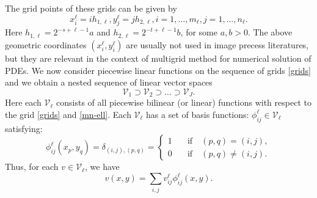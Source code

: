 The grid points of these grids can be given by
$$
x_i^{\ell}=i h_{1,\ell}, y_j^{\ell}=j h_{2,\ell},  i=1, \ldots, m_\ell,
j=1, \ldots, n_\ell.
$$
Here $h_{1,\ell} = 2^{-s + \ell -1}a$ and $h_{2,\ell} = 2^{-t + \ell - 1}b$,
for some $a,b >0$. The above geometric coordinates $(x_i^\ell, y_i^\ell)$
are usually not used in image precess literatures, but they are relevant
in the context of multigrid method for numerical solution of PDEs.
We now consider piecewise linear functions on the sequence of grids
\eqref{grids} and we obtain a nested sequence of linear vector spaces
\begin{equation}
\label{Vk}
\mathcal V_1\supset\mathcal V_2\supset\ldots\supset \mathcal
V_J.
\end{equation}
Here each $\mathcal V_\ell$ consists of all piecewise bilinear (or linear)
functions with respect to the grid \eqref{grids} and \eqref{mn-ell}.
Each $\mathcal V_\ell $ has a set of basis functions:
$\phi_{ij}^\ell\in \mathcal V_\ell$ satisfying:
$$
\phi_{ij}^\ell(x_p,y_q)=\delta_{(i,j), (p,q)} = 
\begin{cases}
1 \quad &\text{if} \quad (p,q) = (i,j), \\
0 \quad &{\text{if}} \quad (p,q)\neq (i,j).
\end{cases}
$$
Thus, for each $v \in \mathcal V_{\ell}$, we have 
\begin{equation}\label{expand}
v(x,y)=\sum_{i,j}v^\ell_{ij}\phi_{ij}^\ell(x,y).
\end{equation}
